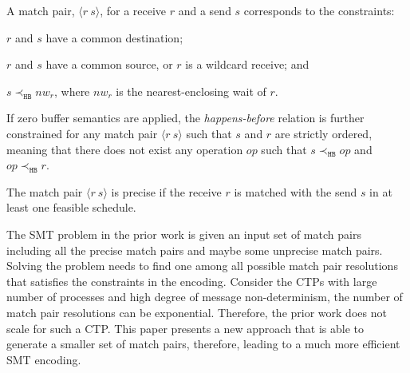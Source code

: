 \begin{definition}
A match pair, $\langle r\ s\rangle$, for a receive $r$ and a send $s$ corresponds to the constraints:
\begin{compactenum}
\item $r$ and $s$ have a common destination;
\item $r$ and $s$ have a common source, or $r$ is a wildcard receive; and
\item $s \prec_{\mathtt{HB}} nw_r$, where $nw_r$ is the nearest-enclosing wait of $r$.
\end{compactenum}
\end{definition} 
If zero buffer semantics are applied, the \textit{happens-before} relation is further constrained for any match pair $\langle r\ s \rangle$ such that $s$ and $r$ are strictly ordered, meaning that there does not exist any operation $op$ such that $s \prec_{\mathtt{HB}} op$ and $op \prec_{\mathtt{HB}} r$. 

\begin{definition}
The match pair $\langle r\ s\rangle$ is precise if the receive $r$ is matched with the send $s$ in at least one feasible schedule.
\end{definition}


The SMT problem in the prior work is given an input set of match pairs including all the precise match pairs and maybe some unprecise match pairs. Solving the problem needs to find one among all possible match pair resolutions that satisfies the constraints in the encoding. Consider the CTPs with large number of processes and high degree of message non-determinism, the number of match pair resolutions can be exponential. Therefore, the prior work does not scale for such a CTP. This paper presents a new approach that is able to generate a smaller set of match pairs, therefore, leading to a much more efficient SMT encoding.






